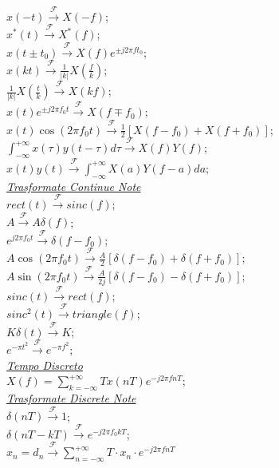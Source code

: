 \documentclass[a4paper]{article}
\begin{document}
\begin{multicols*}{2}
$x(-t) \xrightarrow{\mathscr{F}} X(-f)$; \\
$x^{*}(t) \xrightarrow{\mathscr{F}} X^{*}(f)$; \\
$x(t{\pm}t_0) \xrightarrow{\mathscr{F}} X(f)e^{{\pm}j2{\pi}f{t_0}}$; \\
$x(kt) \xrightarrow{\mathscr{F}} \frac{1}{|k|}X(\frac{f}{k})$; \\
$\frac{1}{|k|}X(\frac{t}{k}) \xrightarrow{\mathscr{F}} X(kf)$; \\
$x(t)e^{{\pm}j2{\pi}{f_0}t} \xrightarrow{\mathscr{F}} X(f{\mp}f_0)$; \\
$x(t)\cos(2{\pi}{f_0}t) \xrightarrow{\mathscr{F}} \frac{1}{2}[X(f - f_0) + X(f + f_0)]$; \\
$\int_{-\infty}^{+\infty}x(\tau)y(t - \tau) d\tau \xrightarrow{\mathscr{F}} X(f)Y(f)$; \\
$x(t)y(t) \xrightarrow{\mathscr{F}} \int_{-\infty}^{+\infty}X(a)Y(f - a) da$; \\
\underline{\textit{Trasformate Continue Note}} \\
$rect(t) \xrightarrow{\mathscr{F}} sinc(f)$; \\
$A \xrightarrow{\mathscr{F}} A\delta (f)$; \\
$e^{j2{\pi}f_{0}t} \xrightarrow{\mathscr{F}} \delta (f-f_0)$; \\
$A\cos(2{\pi}f_{0}t) \xrightarrow{\mathscr{F}} {\frac{A}{2}}[\delta(f-f_0) + \delta(f+f_0)]$; \\
$A\sin(2{\pi}f_{0}t) \xrightarrow{\mathscr{F}} {\frac{A}{2j}}[\delta(f-f_0) - \delta(f+f_0)]$; \\
$sinc(t) \xrightarrow{\mathscr{F}} rect(f)$; \\
$sinc^2(t) \xrightarrow{\mathscr{F}} triangle(f)$; \\
$K\delta(t) \xrightarrow{\mathscr{F}} K$; \\
$e^{-\pi{t^2}} \xrightarrow{\mathscr{F}} e^{-\pi{f^2}}$; \\
\underline{\textit{Tempo Discreto}} \\
$X(f) = \sum_{k=-\infty}^{+\infty}{Tx(nT)e^{-j2\pi fnT}}$; \\
\underline{\textit{Trasformate Discrete Note}} \\
$\delta(nT) \xrightarrow{\mathscr{F}} 1$; \\
$\delta(nT - kT) \xrightarrow{\mathscr{F}} e^{-j2{\pi}{f_0}kT}$; \\
$x_n = d_n \xrightarrow{\mathscr{F}} \sum_{n=-\infty}^{+\infty}T\cdot x_n\cdot e^{-j2\pi fnT}$ \\

\end{multicols*}
\end{document}
